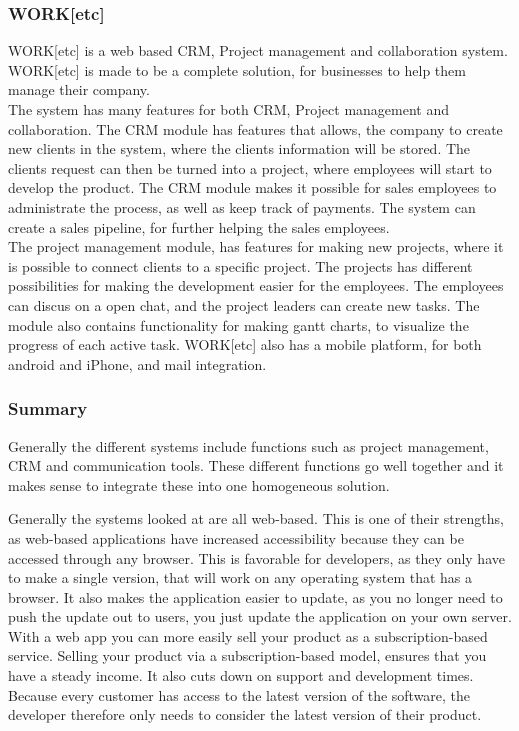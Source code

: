 \subsubsection{WORK[etc]}
WORK[etc] is a web based CRM, Project management and collaboration system. WORK[etc] is made to be a complete solution, for businesses to help them manage their company.\\
The system has many features for both CRM, Project management and collaboration. The CRM module has features that allows, the company to create new clients in the system, where the clients information will be stored. The clients request can then be turned into a project, where employees will start to develop the product. The CRM module makes it possible for sales employees to administrate the process, as well as keep track of payments. The system can create a sales pipeline, for further helping the sales employees. \\
The project management module, has features for making new projects, where it is possible to connect clients to a specific project. The projects has different possibilities for making the development easier for the employees. The employees can discus on a open chat, and the project leaders can create new tasks. The module also contains functionality for making gantt charts, to visualize the progress of each active task. WORK[etc] also has a mobile platform, for both android and iPhone, and mail integration. \citep{website:WORK[etc]} 

\subsubsection{Summary}
Generally the different systems include functions such as project management, CRM and communication tools. These different functions go well together and it makes sense to integrate these into one homogeneous solution. 

Generally the systems looked at are all web-based. This is one of their strengths, as web-based applications have increased accessibility because they can be accessed through any browser. This is favorable for developers, as they only have to make a single version, that will work on any operating system that has a browser. It also makes the application easier to update, as you no longer need to push the update out to users, you just update the application on your own server. 
With a web app you can more easily sell your product as a subscription-based service\citep{website:subscription}. Selling your product via a subscription-based model, ensures that you have a steady income. It also cuts down on support and development times. Because every customer has access to the latest version of the software, the developer therefore only needs to consider the latest version of their product.


